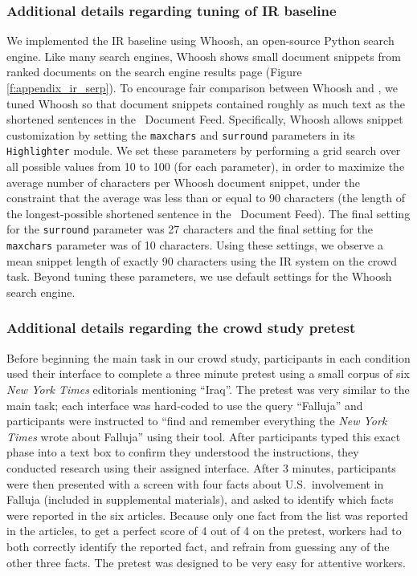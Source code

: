 \subsubsection*{Additional details regarding tuning of IR baseline}
We implemented the IR baseline using Whoosh, an open-source Python search engine. Like many search engines, Whoosh shows small document snippets from ranked documents on the search engine results page (Figure \ref{f:appendix_ir_serp}). To encourage fair comparison between Whoosh and \ours, we tuned Whoosh so that document snippets contained roughly as much text as the shortened sentences in the \ours~Document Feed. 
Specifically, Whoosh allows snippet customization by setting the \texttt{maxchars} and \texttt{surround} parameters in its \texttt{Highlighter} module.
We set these parameters by performing a grid search over all possible values from 10 to 100 (for each parameter), in order to maximize the average number of characters per Whoosh document snippet, under the constraint that the average was less than or equal to 90 characters (the length of the longest-possible shortened sentence in the \ours~Document Feed).
The final setting for the \texttt{surround} parameter was 27 characters and the final setting for the \texttt{maxchars} parameter was of 10 characters. Using these settings, we observe a mean snippet length of exactly 90 characters using the IR system on the crowd task.
Beyond tuning these parameters, we use default settings for the Whoosh search engine.

\subsubsection*{Additional details regarding the crowd study pretest}
Before beginning the main task in our crowd study, participants in each condition used their interface to complete a three minute pretest using a small corpus of six \textit{New York Times} editorials mentioning ``Iraq''. 
The pretest was very similar to the main task; each interface was hard-coded to use the query ``Falluja'' and 
participants were instructed to ``find and remember everything the \textit{New York Times} wrote about Falluja'' using their tool.
After participants typed this exact phase into a text box to confirm they understood the instructions, they conducted research using their assigned interface.
After 3 minutes, participants were then presented with a screen with four facts about U.S.\ involvement in Falluja (included in supplemental materials),
and asked to identify which facts were reported in the six articles.
Because only one fact from the list was reported in the articles, 
to get a perfect score of 4 out of 4 on the pretest, workers had to both correctly identify the reported fact, and refrain from guessing any of the other three facts. 
The pretest was designed to be very easy for attentive workers.

